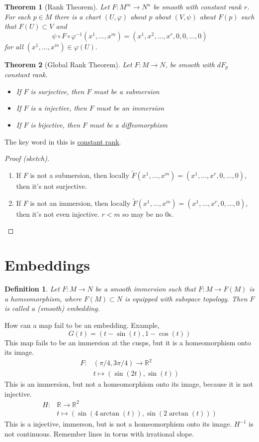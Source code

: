 \documentclass[a4paper]{article}
\newtheorem*{defn}{Definition}
\newtheorem*{thm}{Theorem}
\begin{document}
\begin{thm}[Rank Theorem]
  Let $F: M^m \rightarrow N^n$ be smooth with constant rank $r$. For each $p \in M$ there is a chart $(U, \varphi)$ about $p$ about $(V, \psi)$ about $F(p)$ such that $F(U) \subset V$  and
  \[
    \psi \circ F \circ \varphi^{-1}(x^1, \dots, x^m) = (x^1, x^2, \dots, x^r, 0, 0, \dots, 0)
  \]
  for all $(x^1, \dots, x^m) \in \varphi(U).$
\end{thm}

\begin{thm}[Global Rank Theorem]
  Let $F: M \rightarrow N$, be smooth with $dF_p$ constant rank. 
  \begin{itemize}
    \item If $F$ is surjective, then $F$ must be a submersion 
  \item If $F$ is a injective, then $F$ must be an immersion
  \item If $F$ is bijective, then $F$ must be a diffeomorphism
  \end{itemize}
\end{thm}
The key word in this is \underline{constant rank}.

\begin{proof}[Proof (sketch)]
  \begin{enumerate}
    \item If $F$ is not a submersion, then locally $\tilde{F}(x^1, \dots, x^m) = (x^1, \dots, x^r, 0, \dots, 0)$, then it's not surjective.
    \item If $F$ is not an immersion, then locally $\tilde{F}(x^1, \dots, x^m) = (x^1, \dots, x^r, 0, \dots, 0)$, then it's not even injective. $r < m$ so may be no 0s.
  \end{enumerate}
\end{proof}

\section*{Embeddings}%

\begin{defn}
  Let $F: M \rightarrow N$ be a smooth immersion such that $F: M \rightarrow F(M)$ is a homeomorphism, where $F(M) \subset N$ is equipped with subspace topology. Then $F$ is called a (smooth) embedding.
\end{defn}

How can a map fail to be an embedding. Example, 
\[
  G(t) = (t - \sin(t), 1 - \cos(t))
\]
This map fails to be an immersion at the cusps, but it is a homeomorphism onto its image.
\[
  \begin{aligned}
    F: &(\pi/4, 3\pi/4) \rightarrow \mathds{R}^2 \\
     &t \mapsto (\sin(2t), \sin(t))
  \end{aligned}
\]
This is an immersion, but not a homeomorphism onto its image, because it is not injective.
\[
  \begin{aligned}
    H: &\mathds{R} \rightarrow \mathds{R}^2 \\
     &t \mapsto (\sin(4 \arctan(t)), \sin(2 \arctan(t))) 
  \end{aligned}
\]
This is a injective, immerson, but is not a homeomorphism onto its image. $H^{-1}$ is not continuous. Remember lines in torus with irrational slope.
\end{document}

